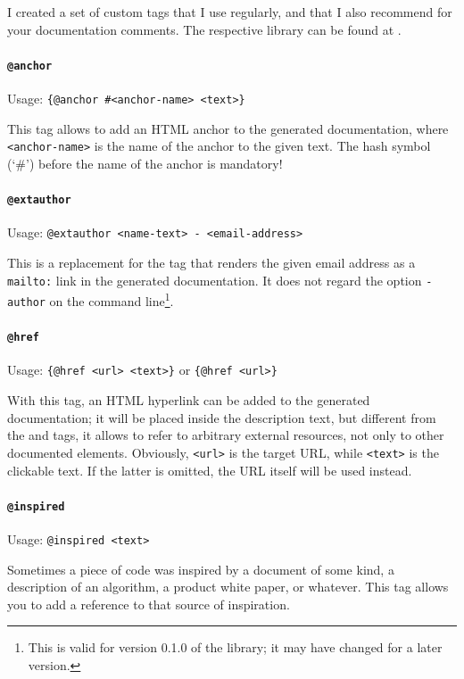 \documentclass[11pt,a4paper, titlepage, parskip=half, headsepline, footsepline, cleardoublepage=current, headheight=1cm]{scrbook}
\begin{document}
I created a set of custom tags that I use regularly, and that I also recommend for your documentation comments. The respective library can be found at \autocite{TQUADRAT_ORG_FOUNDATION_JAVADOC}.

\paragraph{\lstinline|@anchor|}\label{sec:TagAnchor}  Usage: \lstinline|{@anchor #<anchor-name> <text>}|

This tag allows to add an HTML anchor to the generated documentation, where \verb#<anchor-name># is the name of the anchor to the given text. The hash symbol (‘\#’) before the name of the anchor is mandatory!

\paragraph{\lstinline|@extauthor|}\label{sec:TagExtAuthor}  Usage: \lstinline|@extauthor <name-text> - <email-address>|

This is a replacement for the  tag that renders the given email address as a \verb#mailto:# link in the generated documentation. It does not regard the option \verb#-author# on the command line\footnote{This is valid for version 0.1.0 of the library; it may have changed for a later version.}. 

\paragraph{\lstinline|@href|}\label{sec:TagHref}  Usage: \lstinline|{@href <url> <text>}| or \lstinline|{@href <url>}|

With this tag, an HTML hyperlink can be added to the generated documentation; it will be placed inside the description text, but different from the  and  tags, it allows to refer to arbitrary external resources, not only to other documented elements. Obviously, \verb#<url># is the target URL, while \verb#<text># is the clickable text. If the latter is omitted, the URL itself will be used instead.

\paragraph{\lstinline|@inspired|}\label{sec:TagInspired}  Usage: \lstinline|@inspired <text>|

Sometimes a piece of code was inspired by a document of some kind, a description of an algorithm, a product white paper, or whatever. This tag allows you to add a reference to that source of inspiration. 
\end{document}
